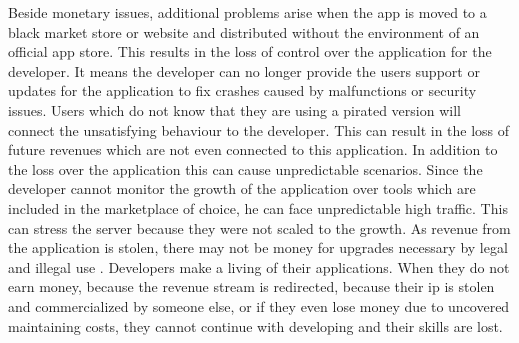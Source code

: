 Beside monetary issues, additional problems arise when the app is moved to a black market store or website  and distributed without the environment of an official app store.
This results in the loss of control over the application for the developer.
It means the developer can no longer provide the users support or updates for the application to fix crashes caused by malfunctions or security issues.
Users which do not know that they are using a pirated version will connect the unsatisfying behaviour to the developer.
This can result in the loss of future revenues which are not even connected to this application.
In addition to the loss over the application this can cause unpredictable scenarios.
Since the developer cannot monitor the growth of the application over tools which are included in the marketplace of choice, he can face unpredictable high traffic.
This can stress the server because they were not scaled to the growth.
As revenue from the application is stolen, there may not be money for upgrades necessary by legal and illegal use \cite{lierschDeveloperThreats}.
\newline
\newline
Developers make a living of their applications.
When they do not earn money, because the revenue stream is redirected, because their \gls{ip} is stolen and commercialized by someone else, or if they even lose money due to uncovered maintaining costs, they cannot continue with developing and their skills are lost.
